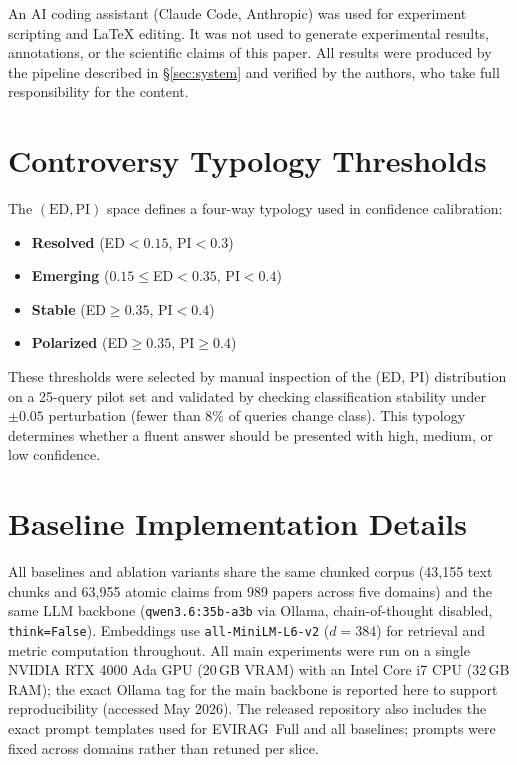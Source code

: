 \documentclass[11pt]{article}
\newcommand{\system}{\textsc{EVIRAG}\xspace}
\begin{document}
An AI coding assistant (Claude Code, Anthropic) was used for experiment
scripting and \LaTeX{} editing.  It was not used to generate experimental
results, annotations, or the scientific claims of this paper.  All results were
produced by the pipeline described in \S\ref{sec:system} and verified by the
authors, who take full responsibility for the content.



\clearpage
\appendix

\section{Controversy Typology Thresholds}
\label{app:typology}

The $(\mathrm{ED},\mathrm{PI})$ space defines a four-way typology used in
confidence calibration:
\begin{itemize}[leftmargin=*,nosep]
  \item \textbf{Resolved} (ED$<0.15$, PI$<0.3$)
  \item \textbf{Emerging} ($0.15\leq$ED$<0.35$, PI$<0.4$)
  \item \textbf{Stable} (ED$\geq 0.35$, PI$<0.4$)
  \item \textbf{Polarized} (ED$\geq 0.35$, PI$\geq 0.4$)
\end{itemize}
These thresholds were selected by manual inspection of the (ED, PI)
distribution on a 25-query pilot set and validated by checking classification
stability under $\pm 0.05$ perturbation (fewer than 8\% of queries change
class).  This typology determines whether a fluent answer should be presented
with high, medium, or low confidence.


\section{Baseline Implementation Details}
\label{app:baselines}

All baselines and ablation variants share the same chunked corpus
(43,155 text chunks and 63,955 atomic claims from 989 papers across five domains)
and the same LLM backbone (\texttt{qwen3.6:35b-a3b} via Ollama, chain-of-thought
disabled, \texttt{think=False}).  Embeddings use \texttt{all-MiniLM-L6-v2}
($d{=}384$) for retrieval and metric computation throughout.
All main experiments were run on a single NVIDIA RTX 4000 Ada GPU
(20\,GB VRAM) with an Intel Core i7 CPU (32\,GB RAM); the exact Ollama tag for the main backbone is reported here to
support reproducibility (accessed May 2026).  The released repository also includes the exact prompt templates used for
\system\ Full and all baselines; prompts were fixed across domains rather than retuned per slice.
\end{document}
